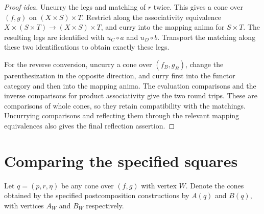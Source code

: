 \documentclass[11pt]{article}
\begin{document}
\begin{proof}[Proof idea]
Uncurry the legs and matching of $r$ twice. This gives a cone over $(f,g)$ on
$(X\times S)\times T$. Restrict along the associativity equivalence
$X\times(S\times T)\to(X\times S)\times T$, and curry into the mapping
anima for $S\times T$. The resulting legs are identified with
$u_C\circ a$ and $u_D\circ b$. Transport the matching along these two
identifications to obtain exactly these legs.

For the reverse conversion, uncurry a cone over $(f_B,g_B)$, change the
parenthesization in the opposite direction, and curry first into the functor
category and then into the mapping anima. The evaluation comparisons and
the inverse comparisons for product associativity give the two round trips.
These are comparisons of whole cones, so they retain compatibility with the
matchings. Uncurrying comparisons and reflecting them through the relevant
mapping equivalences also gives the final reflection assertion.
\end{proof}

\section*{Comparing the specified squares}

Let $q=(p,r,\eta)$ be any cone over $(f,g)$ with vertex $W$. Denote the cones
obtained by the specified postcomposition constructions by $A(q)$ and $B(q)$,
with vertices $A_W$ and $B_W$ respectively.
\end{document}

